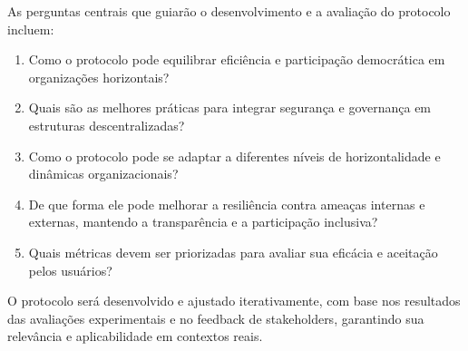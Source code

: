 As perguntas centrais que guiarão o desenvolvimento e a avaliação do
protocolo incluem:

\begin{enumerate}
    \item Como o protocolo pode equilibrar eficiência e participação
democrática em organizações horizontais?
    \item Quais são as melhores práticas para integrar segurança e
governança em estruturas descentralizadas?
    \item Como o protocolo pode se adaptar a diferentes níveis de
horizontalidade e dinâmicas organizacionais?
    \item De que forma ele pode melhorar a resiliência contra ameaças
internas e externas, mantendo a transparência e a participação
inclusiva?
    \item Quais métricas devem ser priorizadas para avaliar sua
eficácia e aceitação pelos usuários?
\end{enumerate}

O protocolo será desenvolvido e ajustado iterativamente, com base nos
resultados das avaliações experimentais e no feedback de stakeholders,
garantindo sua relevância e aplicabilidade em contextos reais.
